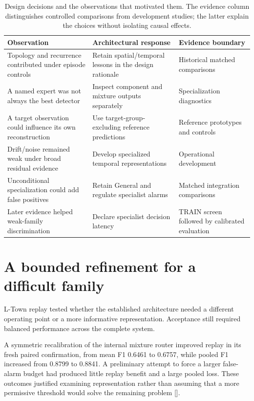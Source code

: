 \begin{table}[tbp]
\centering\small
\caption[Design decisions and the observations that motivated them]{Design decisions and the observations that motivated them. The evidence column distinguishes controlled comparisons from development studies; the latter explain the choices without isolating causal effects.}
\label{tab:decisions}
\begin{tabularx}{\linewidth}{@{}YYY@{}}
\toprule
Observation & Architectural response & Evidence boundary\\
\midrule
Topology and recurrence contributed under episode controls & Retain spatial/temporal lessons in the design rationale & Historical matched comparisons\\
A named expert was not always the best detector & Inspect component and mixture outputs separately & Specialization diagnostics\\
A target observation could influence its own reconstruction & Use target-group-excluding reference predictions & Reference prototypes and controls\\
Drift/noise remained weak under broad residual evidence & Develop specialized temporal representations & Operational development\\
Unconditional specialization could add false positives & Retain General and regulate specialist alarms & Matched integration comparisons\\
Later evidence helped weak-family discrimination & Declare specialist decision latency & TRAIN screen followed by calibrated evaluation\\
\bottomrule
\end{tabularx}
\end{table}

\section{A bounded refinement for a difficult family}
\label{sec:flowcandidates}
L-Town replay tested whether the established architecture needed a different operating point or a more informative representation. Acceptance still required balanced performance across the complete system.

A symmetric recalibration of the internal mixture router improved replay in its fresh paired confirmation, from mean F1 0.6461 to 0.6757, while pooled F1 increased from 0.8799 to 0.8841. A preliminary attempt to force a larger false-alarm budget had produced little replay benefit and a large pooled loss. These outcomes justified examining representation rather than assuming that a more permissive threshold would solve the remaining problem [].


